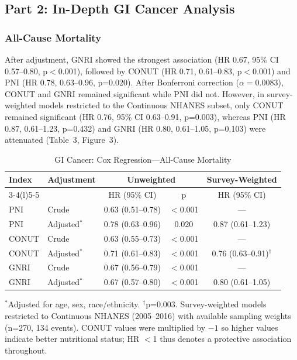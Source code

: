 \documentclass[review]{elsarticle}
\begin{document}
\subsection{Part 2: In-Depth GI Cancer Analysis}

\subsubsection{All-Cause Mortality}

After adjustment, GNRI showed the strongest association (HR 0.67, 95\% CI 0.57--0.80, p$<$0.001), followed by CONUT (HR 0.71, 0.61--0.83, p$<$0.001) and PNI (HR 0.78, 0.63--0.96, p=0.020). After Bonferroni correction ($\alpha=0.0083$), CONUT and GNRI remained significant while PNI did not. However, in survey-weighted models restricted to the Continuous NHANES subset, only CONUT remained significant (HR 0.76, 95\% CI 0.63--0.91, p=0.003), whereas PNI (HR 0.87, 0.61--1.23, p=0.432) and GNRI (HR 0.80, 0.61--1.05, p=0.103) were attenuated (Table~3, Figure~3).

\begin{table}[h]
\caption{GI Cancer: Cox Regression---All-Cause Mortality}
\label{tab:gi_cox}
\centering
\begin{tabular}{llccc}
\toprule
Index & Adjustment & \multicolumn{2}{c}{Unweighted} & Survey-Weighted \\
\cmidrule(lr){3-4}\cmidrule(l){5-5}
   &  & HR (95\% CI) & p & HR (95\% CI) \\
\midrule
PNI & Crude & 0.63 (0.51--0.78) & $<$0.001 & --- \\
PNI & Adjusted$^*$ & 0.78 (0.63--0.96) & 0.020 & 0.87 (0.61--1.23) \\
CONUT & Crude & 0.63 (0.55--0.73) & $<$0.001 & --- \\
CONUT & Adjusted$^*$ & 0.71 (0.61--0.83) & $<$0.001 & 0.76 (0.63--0.91)$^\dagger$ \\
GNRI & Crude & 0.67 (0.56--0.79) & $<$0.001 & --- \\
GNRI & Adjusted$^*$ & 0.67 (0.57--0.80) & $<$0.001 & 0.80 (0.61--1.05) \\
\bottomrule
\end{tabular}
\par\footnotesize $^*$Adjusted for age, sex, race/ethnicity. $^\dagger$p=0.003.
Survey-weighted models restricted to Continuous NHANES (2005--2016) with available sampling weights (n=270, 134 events).
CONUT values were multiplied by $-1$ so higher values indicate better nutritional status; HR $<$1 thus denotes a protective association throughout.
\end{table}
\end{document}
